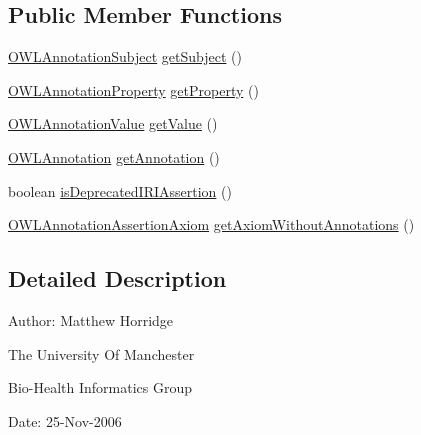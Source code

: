 \subsection*{Public Member Functions}
\begin{DoxyCompactItemize}
\item 
\hyperlink{interfaceorg_1_1semanticweb_1_1owlapi_1_1model_1_1_o_w_l_annotation_subject}{O\-W\-L\-Annotation\-Subject} \hyperlink{interfaceorg_1_1semanticweb_1_1owlapi_1_1model_1_1_o_w_l_annotation_assertion_axiom_a4829ff1106083e6c41a2806fb5dd7468}{get\-Subject} ()
\item 
\hyperlink{interfaceorg_1_1semanticweb_1_1owlapi_1_1model_1_1_o_w_l_annotation_property}{O\-W\-L\-Annotation\-Property} \hyperlink{interfaceorg_1_1semanticweb_1_1owlapi_1_1model_1_1_o_w_l_annotation_assertion_axiom_aa5766fbc41356d40665cabc4b077fbcd}{get\-Property} ()
\item 
\hyperlink{interfaceorg_1_1semanticweb_1_1owlapi_1_1model_1_1_o_w_l_annotation_value}{O\-W\-L\-Annotation\-Value} \hyperlink{interfaceorg_1_1semanticweb_1_1owlapi_1_1model_1_1_o_w_l_annotation_assertion_axiom_a499a9b82362e8618d91aae8ed3b4333f}{get\-Value} ()
\item 
\hyperlink{interfaceorg_1_1semanticweb_1_1owlapi_1_1model_1_1_o_w_l_annotation}{O\-W\-L\-Annotation} \hyperlink{interfaceorg_1_1semanticweb_1_1owlapi_1_1model_1_1_o_w_l_annotation_assertion_axiom_a8e1d7bc923ca1332b04539e9a1896dde}{get\-Annotation} ()
\item 
boolean \hyperlink{interfaceorg_1_1semanticweb_1_1owlapi_1_1model_1_1_o_w_l_annotation_assertion_axiom_ad897909054bb16fcc2700209b49e3320}{is\-Deprecated\-I\-R\-I\-Assertion} ()
\item 
\hyperlink{interfaceorg_1_1semanticweb_1_1owlapi_1_1model_1_1_o_w_l_annotation_assertion_axiom}{O\-W\-L\-Annotation\-Assertion\-Axiom} \hyperlink{interfaceorg_1_1semanticweb_1_1owlapi_1_1model_1_1_o_w_l_annotation_assertion_axiom_a98acb7aa02dee7b8744ddb86566073b1}{get\-Axiom\-Without\-Annotations} ()
\end{DoxyCompactItemize}


\subsection{Detailed Description}
Author\-: Matthew Horridge\par
 The University Of Manchester\par
 Bio-\/\-Health Informatics Group\par
 Date\-: 25-\/\-Nov-\/2006\par
\par
 

